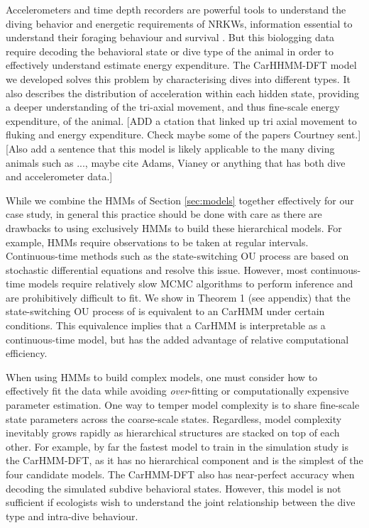 Accelerometers and time depth recorders are powerful tools to understand the diving behavior and energetic requirements of NRKWs, information essential to understand their foraging behaviour and survival \citep{Williams:2009,Noren:2011}. But this biologging data require decoding the behavioral state \citep{Dot:2016} or dive type \citep{Hastie:2006} of the animal in order to effectively understand estimate energy expenditure. The CarHHMM-DFT model we developed solves this problem by characterising dives into different types. It also describes the distribution of acceleration within each hidden state, providing a deeper understanding of the tri-axial movement, and thus fine-scale energy expenditure, of the animal. [ADD a ctation that linked up tri axial movement to fluking and energy expenditure. Check maybe some of the papers Courtney sent.] [Also add a sentence that this model is likely applicable to the many diving animals such as ..., maybe cite Adams, Vianey or anything that has both dive and accelerometer data.]

While we combine the HMMs of Section \ref{sec:models} together effectively for our case study, in general this practice should be done with care as there are drawbacks to using exclusively HMMs to build these hierarchical models. For example, HMMs require observations to be taken at regular intervals. Continuous-time methods such as the state-switching OU process \citep{Michelot:2019} are based on stochastic differential equations and resolve this issue. However, most continuous-time models require relatively slow MCMC algorithms to perform inference and are prohibitively difficult to fit. We show in Theorem 1 (see appendix) that the state-switching OU process of \citet{Michelot:2019} is equivalent to an CarHMM under certain conditions. This equivalence implies that a CarHMM is interpretable as a continuous-time model, but has the added advantage of relative computational efficiency.

When using HMMs to build complex models, one must consider how to effectively fit the data while avoiding \textit{over}-fitting or computationally expensive parameter estimation. One way to temper model complexity is to share fine-scale state parameters across the coarse-scale states. Regardless, model complexity inevitably grows rapidly as hierarchical structures are stacked on top of each other. For example, by far the fastest model to train in the simulation study is the CarHMM-DFT, as it has no hierarchical component and is the simplest of the four candidate models. The CarHMM-DFT also has near-perfect accuracy when decoding the simulated subdive behavioral states. However, this model is not sufficient if ecologists wish to understand the joint relationship between the dive type and intra-dive behaviour. 


